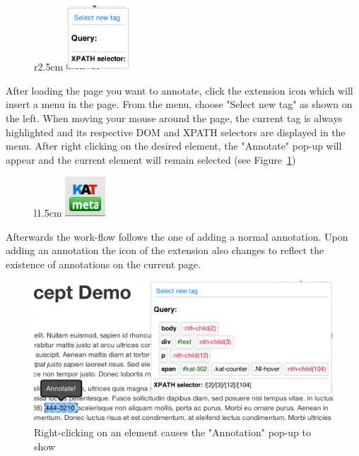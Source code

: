 \begin{figure}r{2.5cm}\vspace*{-1em}
  \includegraphics[width=2.4cm]{../PIC/extension-menu}
\end{figure}
After loading the page you want to annotate, click the extension icon which will insert a
menu in the page. From the menu, choose "Select new tag" as shown on the left.  When
moving your mouse around the page, the current tag is always highlighted and its
respective DOM and XPATH selectors are displayed in the menu.
After right clicking on the desired element, the "Annotate" pop-up will appear and the
current element will remain selected (see Figure~\ref{fig:extension-annotate})

\begin{figure}l{1.5cm}\vspace*{-1em}
  \includegraphics[width=1.5cm]{../PIC/extension-browser-icon-meta}
\end{figure}
Afterwards the work-flow follows the one of adding a normal annotation. Upon adding an
annotation the icon of the extension also changes to reflect the existence of annotations
on the current page.

\begin{figure}[ht]\centering
  \includegraphics[width=5in]{../PIC/extension-annotate}
  \caption{Right-clicking on an element causes the "Annotation" pop-up to
    show}\label{fig:extension-annotate}
\end{figure}



